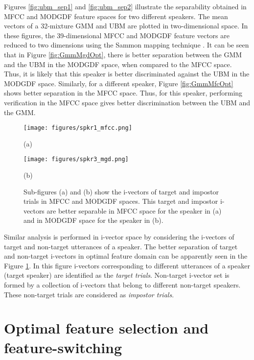 \documentclass{article}
\begin{document}
Figures \ref{fig:ubm_sep1} and \ref{fig:ubm_sep2} illustrate the
separability obtained in MFCC and MODGDF feature spaces for two different
speakers. The mean vectors of a 32-mixture GMM and UBM are plotted in
two-dimensional space. In these figures, the 39-dimensional MFCC and MODGDF
feature vectors are reduced to two dimensions using the Sammon mapping technique
\cite{sammon}. It can be seen that in Figure \ref{fig:GmmMgdOpt}, there is
better separation between the GMM and the UBM in the MODGDF space, when compared
to the MFCC space. Thus, it is likely that this speaker is better discriminated
against the UBM in the MODGDF space. Similarly, for a different speaker, 
Figure \ref{fig:GmmMfcOpt} shows better separation in the MFCC space. Thus,
for this speaker, performing verification in the MFCC space gives better
discrimination between the UBM and the GMM. 

\begin{figure}[h!tb]
\centering \hspace{-5cm}
\begin{minipage}{0.65\textwidth}
\centering 
\texttt{[image: figures/spkr1\_mfcc.png]}
\caption*{(a)}
\label{fig:subfig3}
\end{minipage}%
\begin{minipage}{0.25\textwidth}
\centering \hspace{10cm}
\texttt{[image: figures/spkr3\_mgd.png]}
\caption*{(b)}
\label{fig:subfig4}
\end{minipage}
\caption{Sub-figures (a) and (b) show the i-vectors of target and impostor trials in MFCC and MODGDF spaces. This target and impostor i-vectors are better separable in MFCC space for the speaker in (a) and in MODGDF space for the speaker  in (b).}
\label{fig:ivec_separation}
\end{figure}

Similar analysis is performed in i-vector space by considering the i-vectors of target and non-target utterances of a speaker. The better separation of target and non-target i-vectors in optimal feature domain can be apparently seen in the Figure \ref{fig:ivec_separation}. In this figure i-vectors corresponding to different utterances of a speaker (target speaker) are identified as the \emph{target trials}. Non-target i-vector set is formed by a collection of i-vectors that belong to different non-target speakers. These non-target trials are considered as \emph{impostor trials}. 

\section{Optimal feature selection and feature-switching}
\label{sec:optFeat}
\end{document}
